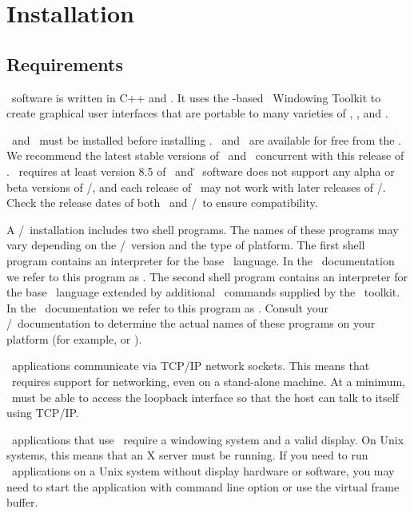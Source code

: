 \section{Installation}\label{sec:install}

\subsection{Requirements}\label{sec:install.requirements}
\OOMMF\ software is written in C++ and \Tcl.  It uses the \Tcl-based
\Tk\ Windowing Toolkit to create graphical user interfaces that are
portable to many varieties of \Unix, \Windows, and \MacOSX.  

\Tcl\ and \Tk\ must be installed before installing \OOMMF.  
\Tcl\ and \Tk\ are available for free from the
.
We recommend the latest stable 
versions of \Tcl\ and \Tk\ concurrent with this release of \OOMMF.
\OOMMF\ requires
at least version 8.5 of \Tcl\ and \Tk\.  \OOMMF\ software 
does not support any alpha or beta versions of \Tcl/\Tk, and 
each release of \OOMMF\ may not work with later releases of
\Tcl/\Tk.  Check the release dates of both \OOMMF\ and
\Tcl/\Tk\ to ensure compatibility.

A \Tcl/\Tk\ installation includes two shell programs.  The names of 
these programs may vary depending on the \Tcl/\Tk\ version and the 
type of platform.  The first shell program contains an interpreter 
for the base \Tcl\ language.  In the \OOMMF\ documentation we refer 
to this program as .  
The second shell program contains 
an interpreter for the base \Tcl\ language extended by additional
\Tcl\ commands supplied by the \Tk\ toolkit.  In the 
\OOMMF\ documentation we refer to this program as 
.  
Consult your \Tcl/\Tk\ documentation to determine 
the actual names of these programs on your platform (for example, 
 or ).

\OOMMF\ applications communicate via TCP/IP network sockets.
This means that \OOMMF\ requires
support for networking, even 
on a stand-alone machine.  At a minimum, \OOMMF\ must be able to 
access the loopback interface so that the host can talk to 
itself using TCP/IP.

\OOMMF\ applications that use \Tk\ require a windowing system and
a valid display.  On Unix systems, this means that an X server must
be running.  If you need to run \OOMMF\ applications on a Unix system
without display hardware or software, you may need to start the 
application with command line option 
or use the
virtual frame buffer.


